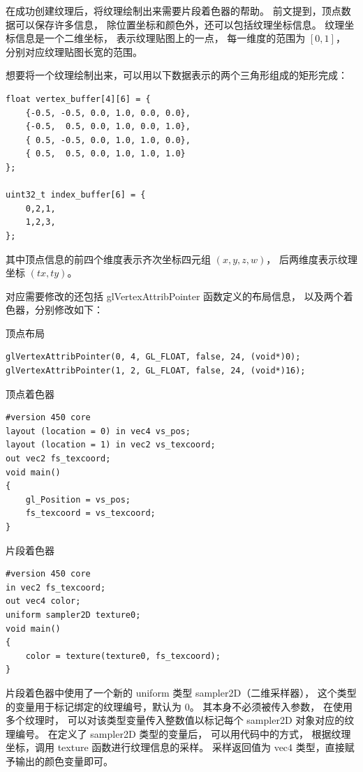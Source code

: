 \documentclass[fontset=windows]{ctexart}
\begin{document}
在成功创建纹理后，将纹理绘制出来需要片段着色器的帮助。
前文提到，顶点数据可以保存许多信息，
除位置坐标和颜色外，还可以包括纹理坐标信息。
纹理坐标信息是一个二维坐标，
表示纹理贴图上的一点，
每一维度的范围为 $[0, 1]$，
分别对应纹理贴图长宽的范围。

想要将一个纹理绘制出来，可以用以下数据表示的两个三角形组成的矩形完成：

\begin{lstlisting}
float vertex_buffer[4][6] = {
    {-0.5, -0.5, 0.0, 1.0, 0.0, 0.0},
    {-0.5,  0.5, 0.0, 1.0, 0.0, 1.0},
    { 0.5, -0.5, 0.0, 1.0, 1.0, 0.0},
    { 0.5,  0.5, 0.0, 1.0, 1.0, 1.0}
};

uint32_t index_buffer[6] = {
    0,2,1,
    1,2,3,
};
\end{lstlisting}

其中顶点信息的前四个维度表示齐次坐标四元组 $(x, y, z, w)$，
后两维度表示纹理坐标 $(tx, ty)$。

对应需要修改的还包括 glVertexAttribPointer 函数定义的布局信息，
以及两个着色器，分别修改如下：

顶点布局

\begin{lstlisting}
glVertexAttribPointer(0, 4, GL_FLOAT, false, 24, (void*)0);
glVertexAttribPointer(1, 2, GL_FLOAT, false, 24, (void*)16);
\end{lstlisting}

顶点着色器

\begin{lstlisting}
#version 450 core
layout (location = 0) in vec4 vs_pos;
layout (location = 1) in vec2 vs_texcoord;
out vec2 fs_texcoord;
void main()
{
    gl_Position = vs_pos;
    fs_texcoord = vs_texcoord;
}
\end{lstlisting}

片段着色器

\begin{lstlisting}
#version 450 core
in vec2 fs_texcoord;
out vec4 color;
uniform sampler2D texture0;
void main()
{
    color = texture(texture0, fs_texcoord);
}
\end{lstlisting}

片段着色器中使用了一个新的 uniform 类型 sampler2D（二维采样器），
这个类型的变量用于标记绑定的纹理编号，默认为 0。
其本身不必须被传入参数，
在使用多个纹理时，
可以对该类型变量传入整数值以标记每个 sampler2D 对象对应的纹理编号。
在定义了 sampler2D 类型的变量后，
可以用代码中的方式，
根据纹理坐标，调用 texture 函数进行纹理信息的采样。
采样返回值为 vec4 类型，直接赋予输出的颜色变量即可。
\end{document}
